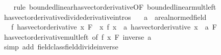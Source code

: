 \begin{isabellebody}
%
\isadelimproof
\ \ %
\endisadelimproof
%
\isatagproof
{}\isamarkupfalse%
\ {\isacharparenleft}{\kern0pt}rule\ bounded{\isacharunderscore}{\kern0pt}linear{\isachardot}{\kern0pt}has{\isacharunderscore}{\kern0pt}vector{\isacharunderscore}{\kern0pt}derivative{\isacharbrackleft}{\kern0pt}OF\ bounded{\isacharunderscore}{\kern0pt}linear{\isacharunderscore}{\kern0pt}mult{\isacharunderscore}{\kern0pt}left{\isacharbrackright}{\kern0pt}{\isacharparenright}{\kern0pt}%
\endisatagproof
{\isafoldproof}%
%
\isadelimproof
\isanewline
%
\endisadelimproof
\isanewline
{}\isamarkupfalse%
\ has{\isacharunderscore}{\kern0pt}vector{\isacharunderscore}{\kern0pt}derivative{\isacharunderscore}{\kern0pt}divide{\isacharbrackleft}{\kern0pt}derivative{\isacharunderscore}{\kern0pt}intros{\isacharbrackright}{\kern0pt}{\isacharcolon}{\kern0pt}\isanewline
\ \ \ a\ {\isacharcolon}{\kern0pt}{\isacharcolon}{\kern0pt}\ {\isachardoublequoteopen}{\isacharprime}{\kern0pt}a{\isacharcolon}{\kern0pt}{\isacharcolon}{\kern0pt}real{\isacharunderscore}{\kern0pt}normed{\isacharunderscore}{\kern0pt}field{\isachardoublequoteclose}\isanewline
\ \ \ {\isachardoublequoteopen}{\isacharparenleft}{\kern0pt}f\ has{\isacharunderscore}{\kern0pt}vector{\isacharunderscore}{\kern0pt}derivative\ x{\isacharparenright}{\kern0pt}\ F\ {\isasymLongrightarrow}\ {\isacharparenleft}{\kern0pt}{\isacharparenleft}{\kern0pt}{\isasymlambda}x{\isachardot}{\kern0pt}\ f\ x\ {\isacharslash}{\kern0pt}\ a{\isacharparenright}{\kern0pt}\ has{\isacharunderscore}{\kern0pt}vector{\isacharunderscore}{\kern0pt}derivative\ {\isacharparenleft}{\kern0pt}x\ {\isacharslash}{\kern0pt}\ a{\isacharparenright}{\kern0pt}{\isacharparenright}{\kern0pt}\ F{\isachardoublequoteclose}\isanewline
%
\isadelimproof
\ \ %
\endisadelimproof
%
\isatagproof
{}\isamarkupfalse%
\ has{\isacharunderscore}{\kern0pt}vector{\isacharunderscore}{\kern0pt}derivative{\isacharunderscore}{\kern0pt}mult{\isacharunderscore}{\kern0pt}left\ {\isacharbrackleft}{\kern0pt}of\ f\ x\ F\ {\isachardoublequoteopen}inverse\ a{\isachardoublequoteclose}{\isacharbrackright}{\kern0pt}\isanewline
\ \ \isamarkupfalse%
\ {\isacharparenleft}{\kern0pt}simp\ add{\isacharcolon}{\kern0pt}\ field{\isacharunderscore}{\kern0pt}class{\isachardot}{\kern0pt}field{\isacharunderscore}{\kern0pt}divide{\isacharunderscore}{\kern0pt}inverse{\isacharparenright}{\kern0pt}%
\endisatagproof
{\isafoldproof}%
%
\isadelimproof
%
\endisadelimproof
%
\isadelimdocument
%
\endisadelimdocument
%
\isatagdocument
%
\end{isabellebody}
